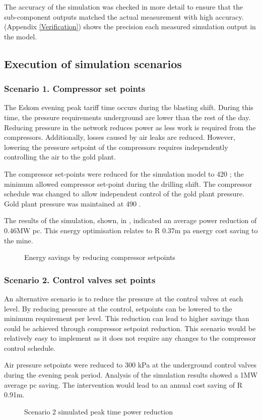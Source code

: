 \par
The accuracy of the simulation was checked in more detail to ensure that the sub-component outputs matched the actual measurement with high accuracy. (Appendix \ref{Verification}) shows the precision each measured simulation output in the model.
\subsection{Execution of simulation scenarios}
\subsubsection{Scenario 1. Compressor set points}
The Eskom evening peak tariff time occurs during the blasting shift. During this time, the pressure requirements underground are lower than the rest of the day. Reducing pressure in the network reduces power as less work is required from the compressors. Additionally, losses caused by air leaks are reduced. However, lowering the pressure setpoint of the compressors requires independently controlling the air to the gold plant. 
\par 
The compressor set-points were reduced for the simulation model to 420 ; the minimum allowed compressor set-point during the drilling shift. The compressor schedule was changed to allow independent control of the gold plant pressure. Gold plant pressure was maintained at 490 . 
\par 
The results of the simulation, shown, in , indicated an average power reduction of 0.46MW \gls{pc}. This energy optimisation relates to R 0.37m \gls{pa} energy cost saving to the mine.
\clearpage 
\begin{figure}[!htbp]
	\centering
	
	\caption{Energy savings by reducing compressor setpoints}
	\label{fig: CompSetpoints Results Beatrix}
\end{figure}

\subsubsection{Scenario 2. Control valves set points}
An alternative scenario is to reduce the pressure at the control valves at each level. By reducing pressure at the control, setpoints can be lowered to the minimum requirement per level. This reduction can lead to higher savings than could be achieved through compressor setpoint reduction. This scenario would be relatively easy to implement as it does not require any changes to the compressor control schedule.
\par 
Air pressure setpoints were reduced to 300 kPa at the underground control valves during the evening peak period. Analysis of the simulation results showed a 1MW average \gls{pc} saving. The intervention would lead to an annual cost saving of R 0.91m.
\begin{figure}[h!]
	\centering
	
	\caption{Scenario 2 simulated peak time power reduction}
	\label{fig: Control Valve Results Beatrix}
\end{figure}
